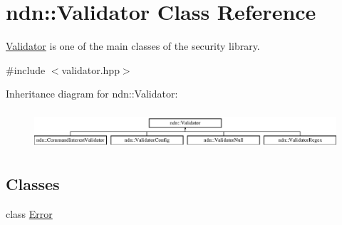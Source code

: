 \hypertarget{classndn_1_1Validator}{}\section{ndn\+:\+:Validator Class Reference}
\label{classndn_1_1Validator}


\hyperlink{classndn_1_1Validator}{Validator} is one of the main classes of the security library.  




{\ttfamily \#include $<$validator.\+hpp$>$}

Inheritance diagram for ndn\+:\+:Validator\+:\begin{figure}[H]
\begin{center}
\leavevmode
\includegraphics[height=1.443299cm]{classndn_1_1Validator}
\end{center}
\end{figure}
\subsection*{Classes}
\begin{DoxyCompactItemize}
\item 
class \hyperlink{classndn_1_1Validator_1_1Error}{Error}
\end{DoxyCompactItemize}

